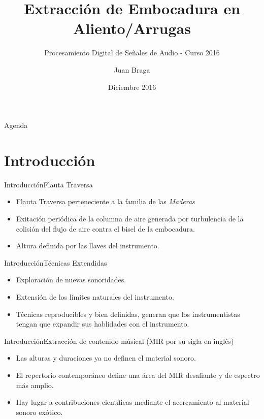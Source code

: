 \documentclass[aspectratio=169]{beamer}
\title{Extracción de Embocadura en Aliento/Arrugas}
\subtitle{Procesamiento Digital de Señales de Audio - Curso 2016}
\author{Juan Braga}%
\institute[IIE-FING-UDELAR] %
{
  Instituto de Ingeniería Eléctrica (IIE)\\
  Facultad de Ingeniería (FING)\\
  Universidad de la República (UdelaR)}
\date{Diciembre 2016}
\begin{document}
\begin{frame}
  \titlepage
\end{frame}

\begin{frame}{Agenda}
  \tableofcontents
\end{frame}

\section{Introducción}

\begin{frame}{Introducción}{Flauta Traversa}
  \begin{itemize}
  \item {
    Flauta Traversa perteneciente a la familia de las \textit{Maderas}
  }
  \item {
    Exitación periódica de la columna de aire generada por turbulencia de la colisión del flujo de aire contra el bisel de la embocadura.
  }
    \item {
    Altura definida por las llaves del instrumento.
  }
  \end{itemize}
\end{frame}

\begin{frame}{Introducción}{Técnicas Extendidas}
  \begin{itemize}
  \item {
    Exploración de nuevas sonoridades.
  }
  \item {
    Extensión de los límites naturales del instrumento.
  }
    \item {
    Técnicas reproducibles y bien definidas, generan que los instrumentistas tengan que expandir sus hablidades con el instrumento.
  }
  \end{itemize}
\end{frame}

\begin{frame}{Introducción}{Extracción de contenido músical (MIR por su sigla en inglés)}
  \begin{itemize}
  \item {
    Las alturas y duraciones ya no definen el material sonoro.
  }
  \item {
    El repertorio contemporáneo define una área del MIR desafiante y de espectro más amplio.
  }
    \item {
   	Hay lugar a contribuciones científicas mediante el acercamiento al material sonoro exótico.
  }
  \end{itemize}
\end{frame}
\end{document}
